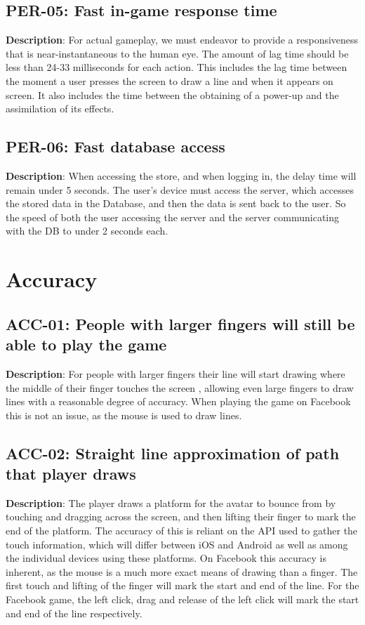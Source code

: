 \subsection{PER-05: Fast in-game response time}
\textbf{Description}: For actual gameplay, we must endeavor to provide a responsiveness
that is near-instantaneous to the human eye. The amount of lag time
should be less than 24-33 milliseconds for each action. This includes
the lag time between the moment a user presses the screen to draw
a line and when it appears on screen. It also includes the time between
the obtaining of a power-up and the assimilation of its effects.
\subsection{PER-06: Fast database access}
\textbf{Description}: When accessing the store, and when logging in, the delay
time will remain under 5 seconds. The user\textquoteright{}s device
must access the server, which accesses the stored data in the Database,
and then the data is sent back to the user. So the speed of both the
user accessing the server and the server communicating with the DB
to under 2 seconds each.
\section{Accuracy}
\subsection{ACC-01: People with larger fingers will still be able to play the
game}
\textbf{Description}: For people with larger fingers their line will start
drawing where the middle of their finger touches the screen , allowing
even large fingers to draw lines with a reasonable degree of accuracy.
When playing the game on Facebook this is not an issue, as the mouse
is used to draw lines. 
\subsection{ACC-02: Straight line approximation of path that player draws}
\textbf{Description}: The player draws a platform for the avatar to bounce
from by touching and dragging across the screen, and then lifting
their finger to mark the end of the platform. The accuracy of this
is reliant on the API used to gather the touch information, which
will differ between iOS and Android as well as among the individual
devices using these platforms. On Facebook this accuracy is inherent,
as the mouse is a much more exact means of drawing than a finger.
The first touch and lifting of the finger will mark the start and
end of the line. For the Facebook game, the left click, drag and release
of the left click will mark the start and end of the line respectively.
